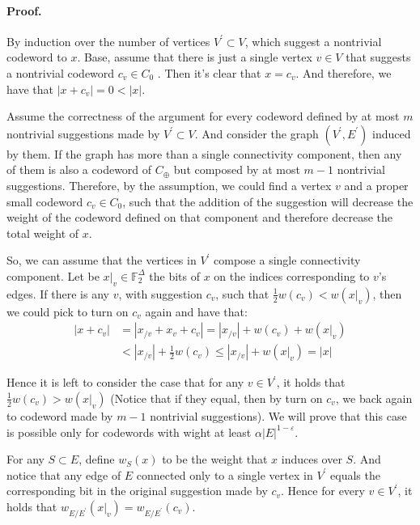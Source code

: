 \documentclass{article}
\begin{document}
\begin{multicols*}{2}
\paragraph{Proof.} By induction over the number of vertices $V^\prime \subset V$, which suggest a nontrivial codeword to $x$. Base, assume that there is just a single vertex $v \in V$ that suggests a nontrivial codeword $c_{v} \in C_{0}$ . Then it's clear that $x = c_{v}$. And therefore, we have that $|x +c_{v}| = 0 < |x|$.

Assume the correctness of the argument for every codeword defined by at most $m$ nontrivial suggestions made by $V^\prime \subset V$.  And consider the graph $\left( V^\prime, E^\prime \right)$ induced by them. If the graph has more than a single connectivity component, then any of them is also a codeword of $C_{\oplus}$  but composed by at most $m-1$ nontrivial suggestions. Therefore, by the assumption, we could find a vertex $v$ and a proper small codeword $c_v \in C_0 $, such that the addition of the suggestion will decrease the weight of the codeword defined on that component and therefore decrease the total weight of $x$.

So, we can assume that the vertices in $V^\prime$ compose a single connectivity component. Let be $x|_{v} \in \mathbb{F}_{2}^{\Delta}$ the bits of $x$ on the indices corresponding to $v$'s edges. If there is any $v$, with suggestion $c_{v}$, such that $ \frac{1}{2}w\left( c_{v}\right) < w\left( x|_{v} \right)$, then we could pick to turn on $c_{v}$ again and have that:
\begin{equation*}
  \begin{split}
    |x+c_{v}| & = | x_{/v} + x_{v} + c_{v}| = |x_{/v}| + w\left( c_{v} \right) + w\left( x|_{v} \right) \\
    & < |x_{/v}| + \frac{1}{2}w\left( c_{v} \right) \le |x_{/v}| + w\left( x|_{v} \right) = |x|
  \end{split}
\end{equation*}

Hence it is left to consider the case that for any $v\in V^\prime$, it holds that $\frac{1}{2}w\left( c_{v}\right) >  w\left( x|_{v} \right)$ (Notice that if they equal, then by turn on $c_{v}$, we back again to codeword made by $m-1$ nontrivial suggestions). We will prove that this case is possible only for codewords with wight at least $\alpha|E|^{1-\varepsilon}$.

For any $S \subset E$, define $w_{S}\left( x \right)$ to be the weight that $x$ induces over $S$. And notice that any edge of $E$ connected only to a single vertex in $V^\prime$ equals the corresponding bit in the original suggestion made by $c_{v}$. Hence for every $v\in V^\prime$, it holds that $w_{E / E^\prime}\left(x|_{v}\right) = w_{E / E^\prime}\left(c_{v}\right)$. 

\end{multicols*}
\end{document}
